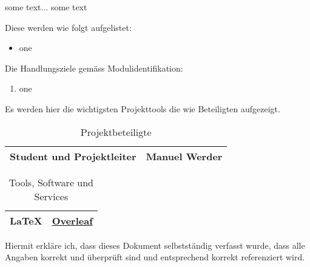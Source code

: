 \mode*

\label{sec:einleitung}
some text...
\vSpaceStyle{}
some text

\label{subsec:vorgaben}
Diese werden wie folgt aufgelistet:

\begin{itemize}
    \item one
\end{itemize}


\label{subsec:modulid}
Die Handlungsziele gemäss Modulidentifikation:

\begin{enumerate}
    \item one
\end{enumerate}


\label{subsec:projekt}
Es werden hier die wichtigsten Projekttools die wie Beteiligten aufgezeigt.

\begin{table}[h!]
    \centering
    \begin{tabularx}{0.8\textwidth} {
    | >{\raggedright\arraybackslash}X
    | >{\raggedright\arraybackslash}X | }
        \hline
        Student und Projektleiter & Manuel Werder \\
        \hline
    \end{tabularx}
    \caption{Projektbeteiligte}
    \label{tab:1}
\end{table}

\begin{table}[h!]
    \centering
    \begin{tabularx}{0.8\textwidth} {
    | >{\raggedright\arraybackslash}X
    | >{\raggedright\arraybackslash}X | }
        \hline
        \LaTeX & \href{https://www.overleaf.com}{Overleaf} \\
        \hline
    \end{tabularx}
    \caption{Tools, Software und Services}
    \label{tab:2}
\end{table}



\label{sec:konzepte}



\label{sec:ssk}
Hiermit erkläre ich, dass dieses Dokument selbstständig verfasst wurde, dass alle Angaben korrekt
und überprüft sind und entsprechend korrekt referenziert wird.
\vSpaceStyle{}
\gitAuthorDate~\gitAuthorName
